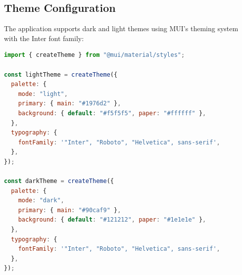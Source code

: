 \subsection{Theme Configuration}

The application supports dark and light themes using MUI's theming system with the Inter font family:

\begin{lstlisting}[language=JavaScript, caption=MUI theme configuration, label=lst:theme-config]
import { createTheme } from "@mui/material/styles";

const lightTheme = createTheme({
  palette: {
    mode: "light",
    primary: { main: "#1976d2" },
    background: { default: "#f5f5f5", paper: "#ffffff" },
  },
  typography: {
    fontFamily: '"Inter", "Roboto", "Helvetica", sans-serif',
  },
});

const darkTheme = createTheme({
  palette: {
    mode: "dark",
    primary: { main: "#90caf9" },
    background: { default: "#121212", paper: "#1e1e1e" },
  },
  typography: {
    fontFamily: '"Inter", "Roboto", "Helvetica", sans-serif',
  },
});
\end{lstlisting}
